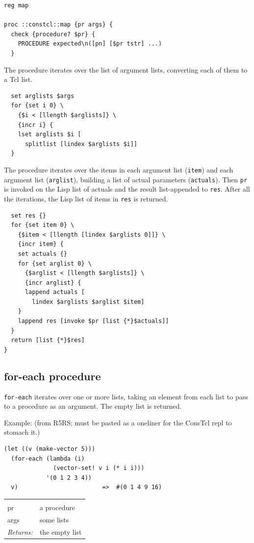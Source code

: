 \documentclass[twoside]{report}
\begin{document}
\begin{lstlisting}
reg map

proc ::constcl::map {pr args} {
  check {procedure? $pr} {
    PROCEDURE expected\n([pn] [$pr tstr] ...)
  }
\end{lstlisting}

The procedure iterates over the list of argument lists, converting each of them to a Tcl list.

\begin{lstlisting}
  set arglists $args
  for {set i 0} \
    {$i < [llength $arglists]} \
    {incr i} {
    lset arglists $i [
      splitlist [lindex $arglists $i]]
  }
\end{lstlisting}

The procedure iterates over the items in each argument list (\texttt{item}) and each argument list (\texttt{arglist}), building a list of actual parameters (\texttt{actuals}). Then \texttt{pr} is invoked on the Lisp list of actuals and the result list-appended to \texttt{res}. After all the iterations, the Lisp list of items in \texttt{res} is returned.

\begin{lstlisting}
  set res {}
  for {set item 0} \
    {$item < [llength [lindex $arglists 0]]} \
    {incr item} {
    set actuals {}
    for {set arglist 0} \
      {$arglist < [llength $arglists]} \
      {incr arglist} {
      lappend actuals [
        lindex $arglists $arglist $item]
    }
    lappend res [invoke $pr [list {*}$actuals]]
  }
  return [list {*}$res]
}
\end{lstlisting}

\subsection{for-each procedure}
\label{foreach-procedure}

\texttt{for-each} iterates over one or more lists, taking an element from each list to pass to a procedure as an argument. The empty list is returned.

Example: (from R5RS; must be pasted as a oneliner for the ConsTcl repl to stomach it.)

\begin{verbatim}
(let ((v (make-vector 5)))
  (for-each (lambda (i)
              (vector-set! v i (* i i)))
            '(0 1 2 3 4))
  v)                        =>  #(0 1 4 9 16)
\end{verbatim}

\noindent\begin{tabular}{ |p{1.9cm} p{8cm}| }
\hline
\rowcolor[HTML]{CCCCCC} \multicolumn{2}{|l|}{\bf for-each (public)} \\
pr & a procedure \\
args & some lists \\
\textit{Returns:} & the empty list \\
\hline
\end{tabular}
\end{document}
